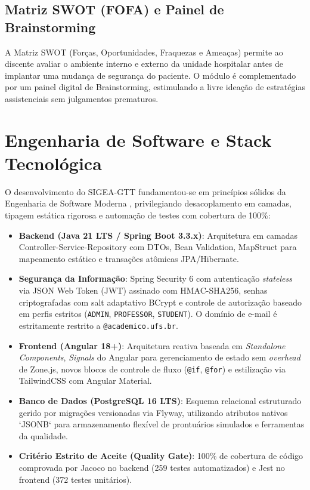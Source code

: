 \subsection{Matriz SWOT (FOFA) e Painel de Brainstorming}
A Matriz SWOT (Forças, Oportunidades, Fraquezas e Ameaças) permite ao discente avaliar o ambiente interno e externo da unidade hospitalar antes de implantar uma mudança de segurança do paciente. O módulo é complementado por um painel digital de Brainstorming, estimulando a livre ideação de estratégias assistenciais sem julgamentos prematuros.

\section{Engenharia de Software e Stack Tecnológica}
\label{sec_stack_tecnologica}

O desenvolvimento do SIGEA-GTT fundamentou-se em princípios sólidos da Engenharia de Software Moderna \cite{pressman2021, sommerville2019, martin2018}, privilegiando desacoplamento em camadas, tipagem estática rigorosa e automação de testes com cobertura de 100\%:
\begin{itemize}
    \item \textbf{Backend (Java 21 LTS / Spring Boot 3.3.x)}: Arquitetura em camadas Controller-Service-Repository com DTOs, Bean Validation, MapStruct para mapeamento estático e transações atômicas JPA/Hibernate.
    \item \textbf{Segurança da Informação}: Spring Security 6 com autenticação \textit{stateless} via JSON Web Token (JWT) assinado com HMAC-SHA256, senhas criptografadas com salt adaptativo BCrypt e controle de autorização baseado em perfis estritos (\texttt{ADMIN}, \texttt{PROFESSOR}, \texttt{STUDENT}). O domínio de e-mail é estritamente restrito a \texttt{@academico.ufs.br}.
    \item \textbf{Frontend (Angular 18+)}: Arquitetura reativa baseada em \textit{Standalone Components}, \textit{Signals} do Angular para gerenciamento de estado sem \textit{overhead} de Zone.js, novos blocos de controle de fluxo (\texttt{@if}, \texttt{@for}) e estilização via TailwindCSS com Angular Material.
    \item \textbf{Banco de Dados (PostgreSQL 16 LTS)}: Esquema relacional estruturado gerido por migrações versionadas via Flyway, utilizando atributos nativos `JSONB` para armazenamento flexível de prontuários simulados e ferramentas da qualidade.
    \item \textbf{Critério Estrito de Aceite (Quality Gate)}: 100\% de cobertura de código comprovada por Jacoco no backend (259 testes automatizados) e Jest no frontend (372 testes unitários).
\end{itemize}
